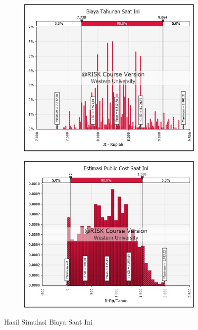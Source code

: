 \begin{figure}[!ht]
    \centering
    \begin{subfigure}{0.48\textwidth}
        \centering
        \includegraphics[width=\textwidth]{grafik/biaya-tahunan-saat-ini.jpg}
    \end{subfigure}
    \hfill  %
    \begin{subfigure}{0.48\textwidth}
        \centering
        \includegraphics[width=\textwidth]{grafik/biaya-publik-saat-ini.jpg}
    \end{subfigure}
    \caption*{Hasil Simulasi Biaya Saat Ini}
    \label{fig:biaya-saat-ini}
\end{figure}

